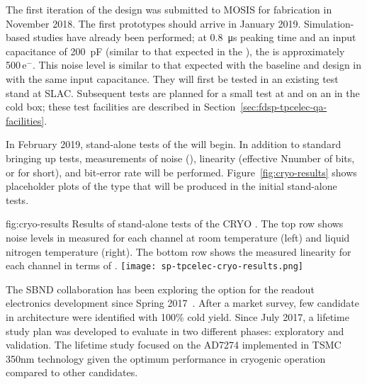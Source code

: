 The first iteration of the   design was submitted to MOSIS  for fabrication in November 2018.  The first prototypes should arrive in January 2019. Simulation-based studies have already been performed; at \SI{0.8}{\micro\second} peaking time and an input capacitance of \SI{200}{pF} (similar to that expected in the  ), the  is approximately \num{500}\,e$^-$.  This noise level is similar to that expected with the baseline  and   design in  with the same input capacitance.  They will first be tested in an existing test stand at SLAC.  Subsequent tests are planned for a small test  at  and on an  in the  cold box; these test facilities are described in Section~\ref{sec:fdsp-tpcelec-qa-facilities}.

In February 2019, stand-alone tests of the   will begin. In addition to standard bringing up tests, measurements of noise (), linearity (effective Nnumber of bits, or  for short), and bit-error rate will be performed. Figure~\ref{fig:cryo-results} shows placeholder plots of the type that will be produced in the initial stand-alone tests.

\begin{dunefigure}
{fig:cryo-results}
{Results of stand-alone tests of the CRYO .  The top row shows noise levels in  measured for each channel at room temperature (left) and liquid nitrogen temperature (right).  The bottom row shows the measured linearity for each channel in terms of . }
\texttt{[image: sp-tpcelec-cryo-results.png]}
\end{dunefigure}

\label{sec:fdsp-tpcelec-design-femb-alt-cots}

The SBND collaboration has been exploring the   option for the  readout electronics development since Spring 2017~\cite{Chen:2018zic}. After a market survey, few candidate  in  architecture were identified with 100\% cold yield. Since July 2017, a lifetime study plan was developed to evaluate   in two different phases: exploratory and validation. The lifetime study focused on the %
 AD7274 implemented in TSMC 350nm  technology given the optimum performance in cryogenic operation compared to other candidates.

